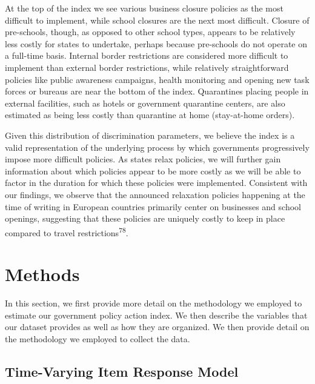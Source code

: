 \documentclass[]{article}
\begin{document}
At the top of the index we see various business closure policies as the most difficult to implement, while school closures are the next most difficult. Closure of pre-schools, though, as opposed to other school types, appears to be relatively less costly for states to undertake, perhaps because pre-schools do not operate on a full-time basis. Internal border restrictions are considered more difficult to implement than external border restrictions, while relatively straightforward policies like public awareness campaigns, health monitoring and opening new task forces or bureaus are near the bottom of the index. Quarantines placing people in external facilities, such as hotels or government quarantine centers, are also estimated as being less costly than quarantine at home (stay-at-home orders).

Given this distribution of discrimination parameters, we believe the index is a valid representation of the underlying process by which governments progressively impose more difficult policies. As states relax policies, we will further gain information about which policies appear to be more costly as we will be able to factor in the duration for which these policies were implemented. Consistent with our findings, we observe that the announced relaxation policies happening at the time of writing in European countries primarily center on businesses and school openings, suggesting that these policies are uniquely costly to keep in place compared to travel restrictions\textsuperscript{78}.

\hypertarget{methods}{%
\section*{Methods}\label{methods}}

In this section, we first provide more detail on the methodology we employed to estimate our government policy action index. We then describe the variables that our dataset provides as well as how they are organized. We then provide detail on the methodology we employed to collect the data.

\hypertarget{time-varying-item-response-model}{%
\subsection*{Time-Varying Item Response Model}\label{time-varying-item-response-model}}
\end{document}
